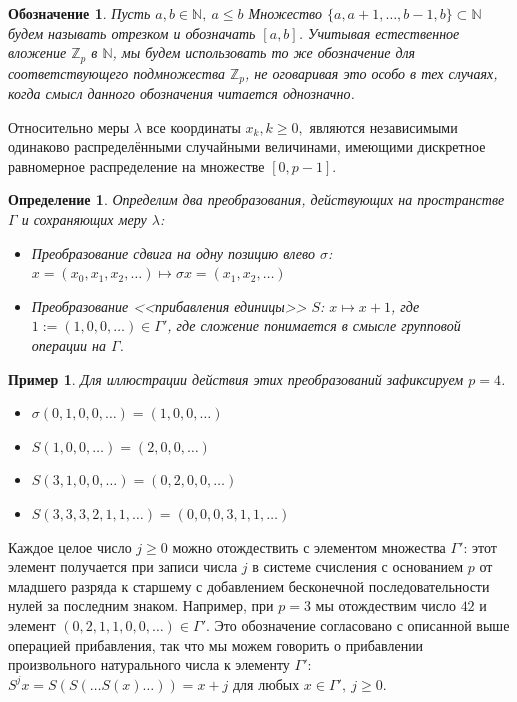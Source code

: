 \documentclass[14pt, a4paper, russian]{report}
\newtheorem{definition}{\indent Определение}
\newtheorem{example}{\indent Пример}
\newtheorem{notation}{\indent Обозначение}
\begin{document}
\begin{notation} 
Пусть $a, b \in \mathbb{N},\ a \le b$ Множество $\{a, a+1, \ldots, b-1, b\} \subset \mathbb{N}$ будем называть отрезком и обозначать $\left[a, b\right]$. Учитывая естественное вложение $\mathbb{Z}_p$ в $\mathbb{N}$, мы будем использовать то же обозначение для соответствующего подмножества $\mathbb{Z}_p$, не оговаривая это особо в тех случаях, когда смысл данного обозначения читается однозначно.
\end{notation}

Относительно меры $\lambda$ все координаты $x_k, k \ge 0,$ являются независимыми одинаково распределёнными случайными величинами, имеющими дискретное равномерное распределение на множестве $\left[0, p-1\right]$. 

\begin{definition} Определим два преобразования, действующих на пространстве $\Gamma$ и сохраняющих меру $\lambda$:
\begin{itemize}
\item Преобразование сдвига на одну позицию влево $\sigma$: $x=\left(x_0, x_1, x_2, \ldots \right) \mapsto \sigma x = \left(x_1, x_2, \ldots \right)$
\item Преобразование <<прибавления единицы>> $S$: $x \mapsto x + 1$, где $1:=(1,0,0,\ldots) \in \Gamma'$, где сложение понимается в смысле групповой операции на $\Gamma$. 
\end{itemize}
\end{definition}
\begin{example}
Для иллюстрации действия этих преобразований зафиксируем $p=4$. 
\begin{itemize}
\item $\sigma (0,1,0,0,\ldots) = (1, 0, 0, \ldots)$
\item $S(1,0,0,\ldots) = (2,0,0,\ldots)$
\item $S(3,1,0,0,\ldots) = (0,2,0,0,\ldots)$
\item $S(3,3,3,2,1,1,\ldots)=(0,0,0,3,1,1,\ldots)$
\end{itemize}
\end{example}

Каждое целое число $j \ge 0$ можно отождествить с элементом множества $\Gamma'$: этот элемент получается при записи числа $j$ в системе счисления с основанием $p$ от младшего разряда к старшему с добавлением бесконечной последовательности нулей за последним знаком. Например, при $p=3$ мы отождествим число $42$ и элемент $(0,2,1,1,0,0,\ldots) \in \Gamma'$. Это обозначение согласовано с описанной выше операцией прибавления, так что мы можем говорить о прибавлении произвольного натурального числа к элементу $\Gamma'$: $S^j x = S(S(\ldots S(x)\ldots)) = x + j$ для любых $x \in \Gamma',\ j \ge 0$.
\end{document}
